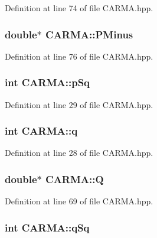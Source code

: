 Definition at line 74 of file C\-A\-R\-M\-A.\-hpp.

\hypertarget{class_c_a_r_m_a_aa0f1ac4385f61138ce0ad9f5dfc10d06}{
\subsubsection[{P\-Minus}]{\setlength{\rightskip}{0pt plus 5cm}double$\ast$ C\-A\-R\-M\-A\-::\-P\-Minus}}\label{class_c_a_r_m_a_aa0f1ac4385f61138ce0ad9f5dfc10d06}


Definition at line 76 of file C\-A\-R\-M\-A.\-hpp.

\hypertarget{class_c_a_r_m_a_a6ae0464e80be268753c9421f7a103562}{
\subsubsection[{p\-Sq}]{\setlength{\rightskip}{0pt plus 5cm}int C\-A\-R\-M\-A\-::p\-Sq}}\label{class_c_a_r_m_a_a6ae0464e80be268753c9421f7a103562}


Definition at line 29 of file C\-A\-R\-M\-A.\-hpp.

\hypertarget{class_c_a_r_m_a_a3322588d9691b02ebb6e7e1b4f9c8ecf}{
\subsubsection[{q}]{\setlength{\rightskip}{0pt plus 5cm}int C\-A\-R\-M\-A\-::q}}\label{class_c_a_r_m_a_a3322588d9691b02ebb6e7e1b4f9c8ecf}


Definition at line 28 of file C\-A\-R\-M\-A.\-hpp.

\hypertarget{class_c_a_r_m_a_a1cd98bc094e960bcf7d8af55528ae72c}{
\subsubsection[{Q}]{\setlength{\rightskip}{0pt plus 5cm}double$\ast$ C\-A\-R\-M\-A\-::\-Q}}\label{class_c_a_r_m_a_a1cd98bc094e960bcf7d8af55528ae72c}


Definition at line 69 of file C\-A\-R\-M\-A.\-hpp.

\hypertarget{class_c_a_r_m_a_a7fc41676954abf3a5b1c74f4ac8abe25}{
\subsubsection[{q\-Sq}]{\setlength{\rightskip}{0pt plus 5cm}int C\-A\-R\-M\-A\-::q\-Sq}}\label{class_c_a_r_m_a_a7fc41676954abf3a5b1c74f4ac8abe25}


